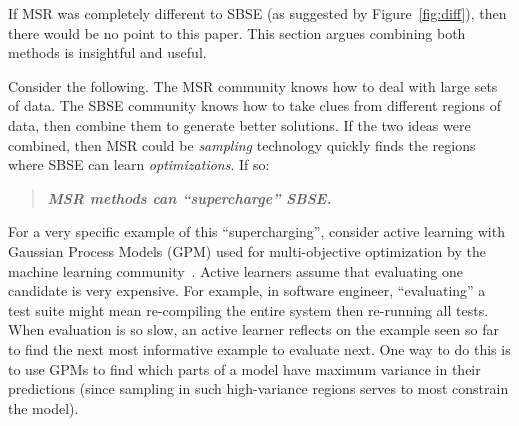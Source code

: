 \documentclass[table, xcdraw, sigconf,review, anonymous]{acmart}
\begin{document}
If MSR was completely different to SBSE (as suggested by Figure~\ref{fig:diff}), 
then there would be no point
to this paper. This section argues combining both methods is insightful and useful.





Consider the following. The MSR
community knows how to deal with large sets of data. The SBSE community knows how to take
clues from different regions of data, then combine them to generate better solutions.
If the two ideas were combined, then  MSR could be  {\em sampling} technology quickly
finds the regions where SBSE  can learn {\em  optimizations}. If so:
\begin{quote}
\centering
{\bf {\em   MSR  methods can ``supercharge''    SBSE.}}
\end{quote}
For a very specific example of this ``supercharging'', consider active learning
with Gaussian Process Models (GPM) used for multi-objective optimization
by the machine learning community~\cite{zuluaga2016varepsilon}.  Active learners assume that evaluating one candidate
is very expensive. For example, in software engineer, ``evaluating'' a test suite
might mean re-compiling
the entire system then re-running all tests. When evaluation is so slow,
an active learner reflects on the example seen so far to find the next most informative
example to evaluate next. One way to do this is to use GPMs  to
find which parts of a model have maximum variance in their predictions 
(since sampling
in such high-variance regions serves to most constrain the model).  
\end{document}
